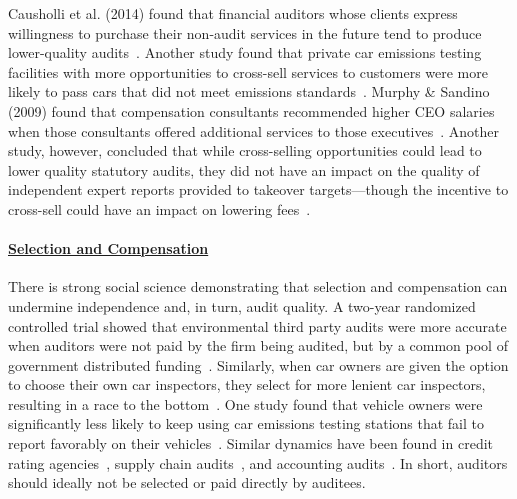 \documentclass[sigconf]{acmart}
\begin{document}
Causholli et al. (2014) found that financial auditors whose clients express willingness to purchase their non-audit services in the future tend to produce lower-quality audits~\cite{causholli2014future}. Another study found that private car emissions testing facilities with more opportunities to cross-sell services to customers were more likely to pass cars that did not meet emissions standards~\cite{pierce2013role}. Murphy \& Sandino (2009) found that compensation consultants recommended higher CEO salaries when those consultants offered additional services to those executives~\cite{murphy2010executive}. Another study, however, concluded that while cross-selling opportunities could lead to lower quality statutory audits, they did not have an impact on the quality of independent expert reports provided to takeover targets—though the incentive to cross-sell could have an impact on lowering fees~\cite{bedford2021quality}.

\paragraph{\underline{Selection and Compensation}} There is strong social science demonstrating that selection and compensation can undermine independence and, in turn, audit quality. A two-year randomized controlled trial showed that environmental third party audits were more accurate when auditors were not paid by the firm being audited, but by a common pool of government distributed funding~\cite{duflo2013truth}. Similarly, when car owners are given the option to choose their own car inspectors, they select for more lenient car inspectors, resulting in a race to the bottom~\cite{hemenway1990you,bennett2013customer}. One study found that vehicle owners were significantly less likely to keep using car emissions testing stations that fail to report favorably on their vehicles~\cite{bennett2013customer,pierce2013role,hubbard2002consumers}. Similar dynamics have been found in credit rating agencies~\cite{jiang2012does,efing2015structured}, supply chain audits~\cite{short2016monitoring}, and accounting audits~\cite{moore2010conflict}. In short, auditors should ideally not be selected or paid directly by auditees.
\end{document}
